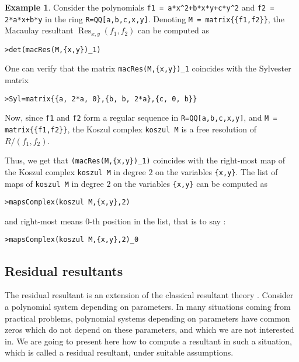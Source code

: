 \documentclass[10pt]{amsart}
\theoremstyle{plain}
\theoremstyle{definition}
\newtheorem{exmp}[thm]{Example}
\DeclareMathOperator\Res{Res}
\begin{document}
\begin{exmp}\label{exmpMacRes}
Consider the polynomials \texttt{f1 = a*x\^{}2+b*x*y+c*y\^{}2} and \texttt{f2 = 2*a*x+b*y} in the ring \texttt{R=QQ[a,b,c,x,y]}. 
Denoting \texttt{M = matrix\{\{f1,f2\}\}}, the Macaulay resultant $\Res_{x,y}(f_1,f_2)$ can be computed as 
\begin{verbatim}
>det(macRes(M,{x,y})_1)
\end{verbatim}
One can verify that the matrix \texttt{macRes(M,\{x,y\})\_1}
coincides with the Sylvester matrix 
\begin{verbatim}
>Syl=matrix{{a, 2*a, 0},{b, b, 2*a},{c, 0, b}}
\end{verbatim}

\medskip

Now, since  \texttt{f1} and \texttt{f2} form a regular sequence in \texttt{R=QQ[a,b,c,x,y]}, and \texttt{M = matrix\{\{f1,f2\}\}}, the Koszul complex \texttt{koszul M} is a free resolution of $R/(f_1,f_2)$.

Thus, we get that \texttt{(macRes(M,\{x,y\})\_1)} coincides with the right-most map of the Koszul complex \texttt{koszul M} in degree $2$ on the variables \texttt{\{x,y\}}. The list of maps of \texttt{koszul M} in degree $2$ on the variables \texttt{\{x,y\}} can be computed as
\begin{verbatim}
>mapsComplex(koszul M,{x,y},2)	
\end{verbatim}
and right-most means $0$-th position in the list, that is to say :
\begin{verbatim}
>mapsComplex(koszul M,{x,y},2)_0	
\end{verbatim}
\end{exmp}


\subsection{Residual resultants}
The residual resultant is an extension of the classical
resultant theory \cite{BEM00,BEM01,Bus01,BusPhD}. Consider a polynomial system
depending on parameters. In many situations coming from practical
problems, polynomial systems 
depending on parameters have common zeros which do not depend on these 
parameters, and which we are not interested in. We are going to
present here how to compute a resultant in such a situation, which is called
a residual resultant, under suitable assumptions. 
 
\end{document}
